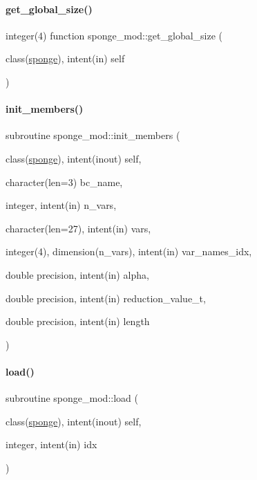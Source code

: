 \paragraph{\texorpdfstring{get\+\_\+global\+\_\+size()}{get\_global\_size()}}
{\footnotesize\ttfamily integer(4) function sponge\+\_\+mod\+::get\+\_\+global\+\_\+size (\begin{DoxyParamCaption}\item[{class(\mbox{\hyperlink{structsponge__mod_1_1sponge}{sponge}}), intent(in)}]{self }\end{DoxyParamCaption})\hspace{0.3cm}{\ttfamily [private]}}

\mbox{\label{namespacesponge__mod_aee13769fc020fcd44dd6f9a15c6859ef}} 
\paragraph{\texorpdfstring{init\+\_\+members()}{init\_members()}}
{\footnotesize\ttfamily subroutine sponge\+\_\+mod\+::init\+\_\+members (\begin{DoxyParamCaption}\item[{class(\mbox{\hyperlink{structsponge__mod_1_1sponge}{sponge}}), intent(inout)}]{self,  }\item[{character(len=3)}]{bc\+\_\+name,  }\item[{integer, intent(in)}]{n\+\_\+vars,  }\item[{character(len=27), intent(in)}]{vars,  }\item[{integer(4), dimension(n\+\_\+vars), intent(in)}]{var\+\_\+names\+\_\+idx,  }\item[{double precision, intent(in)}]{alpha,  }\item[{double precision, intent(in)}]{reduction\+\_\+value\+\_\+t,  }\item[{double precision, intent(in)}]{length }\end{DoxyParamCaption})\hspace{0.3cm}{\ttfamily [private]}}

\mbox{\label{namespacesponge__mod_a78d5ababc793c40554ce37021372e8a5}} 
\paragraph{\texorpdfstring{load()}{load()}}
{\footnotesize\ttfamily subroutine sponge\+\_\+mod\+::load (\begin{DoxyParamCaption}\item[{class(\mbox{\hyperlink{structsponge__mod_1_1sponge}{sponge}}), intent(inout)}]{self,  }\item[{integer, intent(in)}]{idx }\end{DoxyParamCaption})\hspace{0.3cm}{\ttfamily [private]}}

